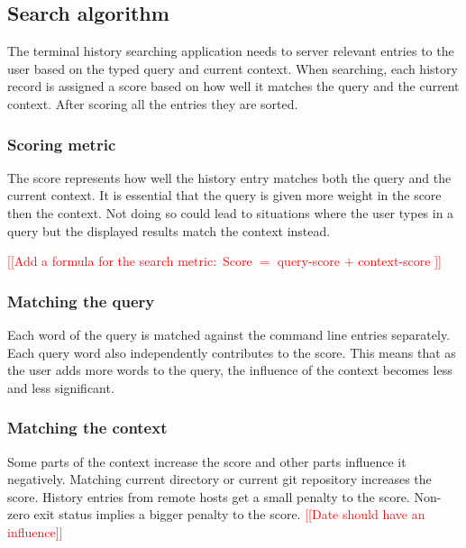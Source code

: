 \documentclass[thesis=M,english]{FITthesis}[2012/10/20]
\newcommand{\redtext}[1]{\textcolor{red}{[[#1]]}}
\begin{document}
\subsection{Search algorithm}

The terminal history searching application needs to server relevant entries to the user based on the typed query and current context. When searching, each history record is assigned a score based on how well it matches the query and the current context. After scoring all the entries they are sorted. %


\subsubsection{Scoring metric}

The score represents how well the history entry matches both the query and the current context. It is essential that the query is given more weight in the score then the context. Not doing so could lead to situations where the user types in a query but the displayed results match the context instead.

\redtext{Add a formula for the search metric$:$ Score $=$ query-score $+$ context-score }

\subsubsection{Matching the query}

Each word of the query is matched against the command line entries separately. Each query word also independently contributes to the score. This means that as the user adds more words to the query, the influence of the context becomes less and less significant.

\subsubsection{Matching the context}

Some parts of the context increase the score and other parts influence it negatively.
Matching current directory or current git repository increases the score.
History entries from remote hosts get a small penalty to the score.
Non-zero exit status implies a bigger penalty to the score. \redtext{Date should have an influence}
\end{document}
